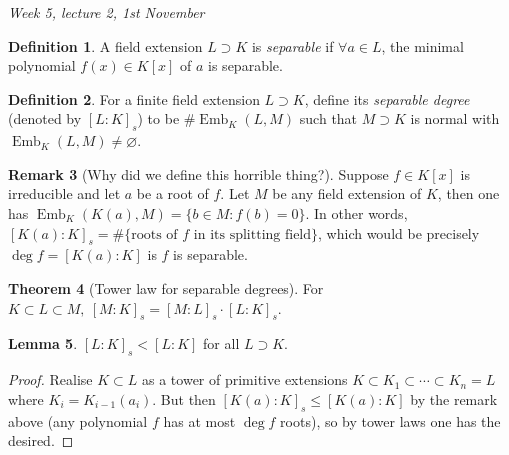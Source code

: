 \documentclass{article}
\newcommand{\Emb}{\operatorname{Emb}}
\theoremstyle{definition}
\newtheorem{defn}{Definition}[subsection]
\newtheorem{thm}[defn]{Theorem}
\newtheorem{lemma}[defn]{Lemma}
\newtheorem{remark}[defn]{Remark}
\begin{document}
\begin{flushright}
\textit{Week 5, lecture 2, 1st November}
\end{flushright}

\begin{defn}
A field extension $L\supset K$ is \textit{separable} if $\forall a\in L$, the minimal polynomial $f(x)\in K[x]$ of $a$ is separable.
\end{defn}

\begin{defn}
For a finite field extension $L\supset K$, define its \textit{separable degree} (denoted by $[L:K]_s$) to be $\#\Emb_K(L,M)$ such that $M\supset K$ is normal with $\Emb_K(L,M)\neq\varnothing$.
\end{defn}

\begin{remark}[Why did we define this horrible thing?]
\label{remark:motivationSepdeg}
Suppose $f\in K[x]$ is irreducible and let $a$ be a root of $f$. Let $M$ be any field extension of $K$, then one has $\Emb_K(K(a),M)=\{b\in M:f(b)=0\}$. In other words, $[K(a):K]_s=\#\{\text{roots of }f\text{ in its splitting field}\}$, which would be precisely $\deg f=[K(a):K]$ is $f$ is separable.
\end{remark}

\begin{thm}[Tower law for separable degrees]
\label{thm:towerlawS}
For $K\subset L\subset M,\ [M:K]_s=[M:L]_s\cdot [L:K]_s$.
\end{thm}

\begin{lemma}
\label{lemma:lastthmCh5}
$[L:K]_s<[L:K]$ for all $L\supset K$.
\end{lemma}
\begin{proof}
Realise $K\subset L$ as a tower of primitive extensions $K\subset K_1\subset\cdots\subset K_n=L$ where $K_i=K_{i-1}(a_i)$. But then $[K(a):K]_s\leq [K(a):K]$ by the remark above (any polynomial $f$ has at most $\deg f$ roots), so by tower laws one has the desired.
\end{proof}
\end{document}
